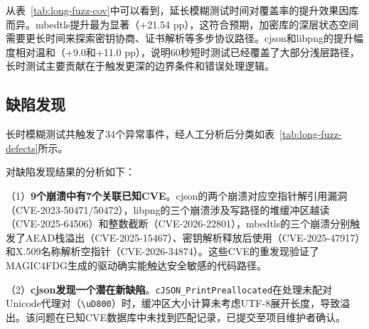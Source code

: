 
从表~\ref{tab:long-fuzz-cov}中可以看到，延长模糊测试时间对覆盖率的提升效果因库而异。mbedtls提升最为显著（+21.54 pp），这符合预期，加密库的深层状态空间需要更长时间来探索密钥协商、证书解析等多步协议路径。cjson和libpng的提升幅度相对温和（+9.0和+11.0 pp），说明60秒短时测试已经覆盖了大部分浅层路径，长时测试主要贡献在于触发更深的边界条件和错误处理逻辑。

\subsection{缺陷发现}

长时模糊测试共触发了34个异常事件，经人工分析后分类如表~\ref{tab:long-fuzz-defects}所示。

\begin{table}[H]
    \centering
    \caption{长时模糊测试缺陷发现统计}
    \label{tab:long-fuzz-defects}
\end{table}

对缺陷发现结果的分析如下：

（1）\textbf{9个崩溃中有7个关联已知CVE}。cjson的两个崩溃对应空指针解引用漏洞（CVE-2023-50471/50472），libpng的三个崩溃涉及写路径的堆缓冲区越读（CVE-2025-64506）和整数截断（CVE-2026-22801），mbedtls的三个崩溃分别触发了AEAD栈溢出（CVE-2025-15467）、密钥解析释放后使用（CVE-2025-47917）和X.509名称解析空指针（CVE-2026-34874）。这些CVE的重发现验证了MAGIC4FDG生成的驱动确实能触达安全敏感的代码路径。

（2）\textbf{cjson发现一个潜在新缺陷}。\texttt{cJSON\_PrintPreallocated}在处理未配对Unicode代理对（\texttt{\textbackslash uD800}）时，缓冲区大小计算未考虑UTF-8展开长度，导致溢出。该问题在已知CVE数据库中未找到匹配记录，已提交至项目维护者确认。

